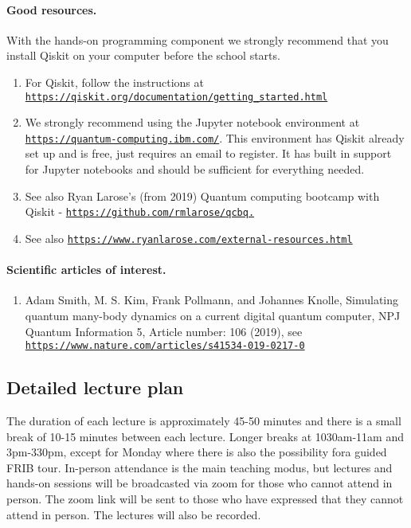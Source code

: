 \documentclass[%
oneside,                 %
final,                   %
10pt]{article}
\begin{document}
\noindent
\paragraph{Good resources.}
With the hands-on programming component we strongly recommend that you install Qiskit on your computer before the school starts. 
\begin{enumerate}
\item For Qiskit, follow the  instructions at \href{{https://qiskit.org/documentation/getting_started.html}}{\nolinkurl{https://qiskit.org/documentation/getting_started.html}}

\item We strongly recommend using the Jupyter notebook environment at \href{{https://quantum-computing.ibm.com/}}{\nolinkurl{https://quantum-computing.ibm.com/}}. This environment has Qiskit already set up and is free,  just requires an email to register. It has built in support for Jupyter notebooks and should be sufficient for everything needed.

\item See also Ryan Larose's (from 2019) Quantum computing bootcamp with Qiskit - \href{{https://github.com/rmlarose/qcbq.}}{\nolinkurl{https://github.com/rmlarose/qcbq.}}

\item See also \href{{https://www.ryanlarose.com/external-resources.html}}{\nolinkurl{https://www.ryanlarose.com/external-resources.html}}
\end{enumerate}

\noindent
\paragraph{Scientific articles of interest.}
\begin{enumerate}
\item Adam Smith, M. S. Kim, Frank Pollmann, and Johannes Knolle, Simulating quantum many-body dynamics on a current digital quantum computer, NPJ Quantum Information 5, Article number: 106 (2019), see \href{{https://www.nature.com/articles/s41534-019-0217-0}}{\nolinkurl{https://www.nature.com/articles/s41534-019-0217-0}}
\end{enumerate}

\noindent
\subsection*{Detailed lecture plan}

The duration of each lecture is approximately 45-50 minutes and there
is a small break of 10-15 minutes between each lecture. Longer breaks
at 1030am-11am and 3pm-330pm, except for Monday where there is also
the possibility fora guided FRIB tour.  In-person attendance is the
main teaching modus, but lectures and hands-on sessions will be
broadcasted via zoom for those who cannot attend in person. The zoom
link will be sent to those who have expressed that they cannot attend
in person. The lectures will also be recorded.
\end{document}
